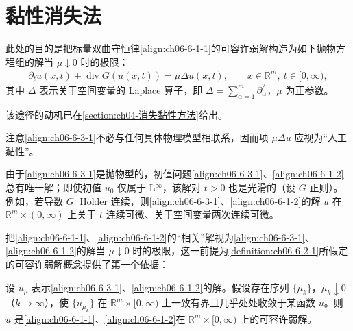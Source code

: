 \documentclass[../../main.tex]{subfiles}
\begin{document}
\section{黏性消失法}\label{section:ch06-黏性消失法}

此处的目的是把标量双曲守恒律\eqref{align:ch06-6-1-1}的可容许弱解构造为如下抛物方程组的解当 $\mu\downarrow 0$ 时的极限：
\begin{align}
\partial_{t}u(x,t)+\operatorname{div}G(u(x,t))=\mu\Delta u(x,t),\qquad x\in\mathbb{R}^{m},\ t\in[0,\infty),
\label{align:ch06-6-3-1}
\end{align}
其中 $\Delta$ 表示关于空间变量的 Laplace 算子，即 $\Delta=\sum_{\alpha=1}^{m}\partial_{\alpha}^{2}$，$\mu$ 为正参数。

该途径的动机已在\cref{section:ch04-消失黏性方法}给出。

注意\eqref{align:ch06-6-3-1}不必与任何具体物理模型相联系，因而项 $\mu\Delta u$ 应视为“人工黏性”。

由于\eqref{align:ch06-6-3-1}是抛物型的，初值问题\eqref{align:ch06-6-3-1}、\eqref{align:ch06-6-1-2}总有唯一解；即使初值 $u_{0}$ 仅属于 L$^{\infty}$，该解对 $t>0$ 也是光滑的（设 $G$ 正则）。例如，若导数 $G^{\prime}$ Hölder 连续，则\eqref{align:ch06-6-3-1}、\eqref{align:ch06-6-1-2}的解 $u$ 在 $\mathbb{R}^{m}\times(0,\infty)$ 上关于 $t$ 连续可微、关于空间变量两次连续可微。

把\eqref{align:ch06-6-1-1}、\eqref{align:ch06-6-1-2}的“相关”解视为\eqref{align:ch06-6-3-1}、\eqref{align:ch06-6-1-2}的解当 $\mu\downarrow 0$ 时的极限，这一前提为\cref{definition:ch06-6-2-1}所假定的可容许弱解概念提供了第一个依据：

\begin{theorem}\label{theorem:ch06-6-3-1}
设 $u_{\mu}$ 表示\eqref{align:ch06-6-3-1}、\eqref{align:ch06-6-1-2}的解。假设存在序列 $\{\mu_{k}\}$，$\mu_{k}\downarrow 0$（$k\to\infty$），使 $\{u_{\mu_{k}}\}$ 在 $\mathbb{R}^{m}\times[0,\infty)$ 上一致有界且几乎处处收敛于某函数 $u$。则 $u$ 是\eqref{align:ch06-6-1-1}、\eqref{align:ch06-6-1-2}在 $\mathbb{R}^{m}\times[0,\infty)$ 上的可容许弱解。
\end{theorem}
\end{document}
